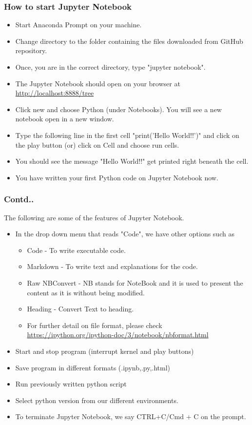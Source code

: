 \documentclass{beamer}
\begin{document}
\begin{frame}
\frametitle{How to start Jupyter Notebook}
\begin{itemize}
\item Start Anaconda Prompt on your machine.
\item Change directory to the folder containing the files downloaded from GitHub repository.
\item Once, you are in the correct directory, type  "jupyter notebook".
\item The Jupyter Notebook should open on your browser at \url{http://localhost:8888/tree}
\item Click new and choose Python (under Notebooks). You will see a new notebook open in a new window.
\item Type the following line in the first cell "print('Hello World!!')" and click on the play button (or) click on Cell and choose run cells.
\item You should see the message "Hello World!!" get printed right beneath the cell.
\item You have written your first Python code on Jupyter Notebook now.
\end{itemize}
\end{frame}

\begin{frame}
\frametitle{Contd..}
The following are some of the features of Jupyter Notebook.
\begin{itemize}
\item In the drop down menu that reads "Code", we have other options such as 
\begin{itemize}
\item Code - To write executable code.
\item Markdown - To write text and explanations for the code.
\item Raw NBConvert - NB stands for NoteBook and it is used to present the content as it is without being modified.
\item Heading -  Convert Text to heading.
\item For further detail on file format, please check \url{https://ipython.org/ipython-doc/3/notebook/nbformat.html} 
\end{itemize}
\item Start and stop program (interrupt kernel and play buttons)
\item Save program in different formats (.ipynb,.py,.html)
\item Run previously written python script
\item Select python version from our different environments.
\item To terminate Jupyter Notebook, we say CTRL+C/Cmd + C on the prompt.
\end{itemize}
\end{frame}
%
%
\end{document}
